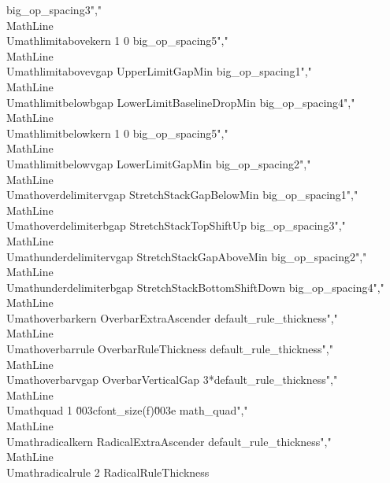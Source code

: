 {big_op_spacing3}","\\MathLine{\\Umathlimitabovekern}           {1}  {}                     {0}                                       {big_op_spacing5}","\\MathLine{\\Umathlimitabovevgap}           {}   {}                     {UpperLimitGapMin}                        {big_op_spacing1}","\\MathLine{\\Umathlimitbelowbgap}           {}   {}                     {LowerLimitBaselineDropMin}               {big_op_spacing4}","\\MathLine{\\Umathlimitbelowkern}           {1}  {}                     {0}                                       {big_op_spacing5}","\\MathLine{\\Umathlimitbelowvgap}           {}   {}                     {LowerLimitGapMin}                        {big_op_spacing2}","\\MathLine{\\Umathoverdelimitervgap}        {}   {}                     {StretchStackGapBelowMin}                 {big_op_spacing1}","\\MathLine{\\Umathoverdelimiterbgap}        {}   {}                     {StretchStackTopShiftUp}                  {big_op_spacing3}","\\MathLine{\\Umathunderdelimitervgap}       {}   {}                     {StretchStackGapAboveMin}                 {big_op_spacing2}","\\MathLine{\\Umathunderdelimiterbgap}       {}   {}                     {StretchStackBottomShiftDown}             {big_op_spacing4}","\\MathLine{\\Umathoverbarkern}              {}   {}                     {OverbarExtraAscender}                    {default_rule_thickness}","\\MathLine{\\Umathoverbarrule}              {}   {}                     {OverbarRuleThickness}                    {default_rule_thickness}","\\MathLine{\\Umathoverbarvgap}              {}   {}                     {OverbarVerticalGap}                      {3*default_rule_thickness}","\\MathLine{\\Umathquad}                     {1}  {}                     {\u003cfont_size(f)\u003e}                          {math_quad}","\\MathLine{\\Umathradicalkern}              {}   {}                     {RadicalExtraAscender}                    {default_rule_thickness}","\\MathLine{\\Umathradicalrule}              {2}  {}                     {RadicalRuleThickness}    